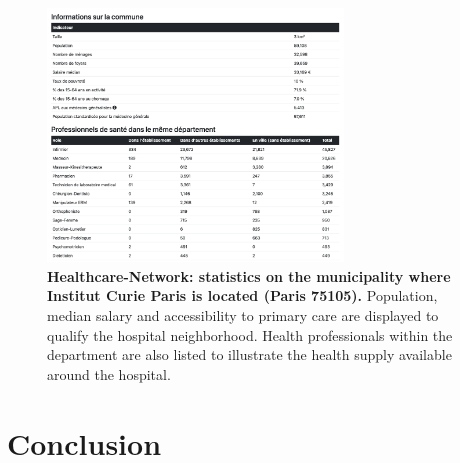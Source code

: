 \begin{figure}[h]
    \includegraphics[width=0.7\textwidth]{images/healthcare-network/curie-commune.png}
    \centering
    \caption{ \textbf{Healthcare-Network: statistics on the municipality where
            Institut Curie Paris is located (Paris 75105).} Population, median
        salary and accessibility to primary care are displayed to qualify the
        hospital neighborhood. Health professionals within the department are
        also listed to illustrate the health supply available around the
        hospital. }
    \label{fig:hn-curie-commune}
\end{figure}

\section{Conclusion}

